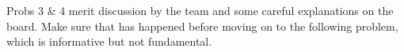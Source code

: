 \documentclass[handout]{mcs}
\begin{document}








\begin{staffnotes}
Probs 3 \& 4 merit discussion by the team and some careful explanations
on the board.  Make sure that has happened before moving on to the
following problem, which is informative but not fundamental.
\end{staffnotes}



\end{document}
